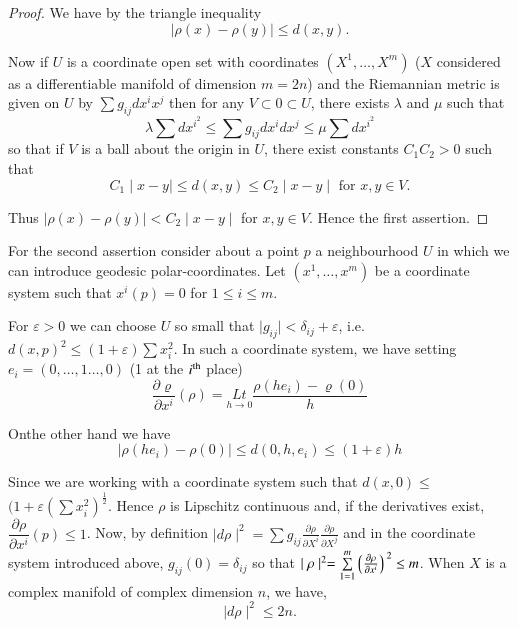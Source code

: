 \begin{proof}
  We have by the triangle inequality 
  $$ 
  \mid \rho  {(x)} - \rho  {(y)} \mid \leq  {d(x ,y)}.
  $$

  Now if $U$ is a coordinate open set with coordinates $(X^1,\ldots ,
  X^m)$ ($X$ considered as a  differentiable manifold of dimension $m=2
  n$) and the Riemannian metric is given on $U$ by $\sum g_{ij}dx^ix^j$
  then for any  $V \subset 0 \subset U$, there exists $\lambda$ and
  $\mu$ such that  
  $$
  \lambda \sum dx^{i^2} \leq \sum  g_{ij}dx^i dx^j \leq \mu \sum
  dx^{i^2}
  $$
  so that if $V$ is a ball about the origin in $U$, there exist constants
  $C_1 C_2 > 0$ such that  
  $$ 
  C_1 \mid x-y \mid \leq d(x, y) \leq C_2 \mid x-y \mid  \text{ for  }
  x, y \in  V. 
  $$

  Thus $ \mid \rho (x) - \rho (y) \mid < C_2 \mid x-y \mid$ for $x, y \in
  V$. Hence the first assertion. 
\end{proof}

For the second assertion consider about a point $p$ a neighbourhood $U$ in
which we can introduce geodesic polar-coordinates. Let $(x^1,
\ldots , x^m)$ be a coordinate system such that $x^i(p)=0$
for $1 \leq i \leq m$.  

For $\varepsilon > 0$ we can choose $U$ so small that $\mid g_{ij}
\mid <\delta_{ij} +\varepsilon$, i.e.  $d(x,p)^2 \leq (1 + \varepsilon ) \sum
x^2_i$. In such a coordinate system, we have setting $e_i = (0,\ldots ,1
\ldots ,0)$ (1 at the $i^{\rm th}$ place)  
$$
\frac{\partial \varrho}{\partial x^i}(\rho) =\underset{h\rightarrow 
  0}{Lt} \frac{\rho (he_i) - \varrho (0)}{h}
$$ 

On\pageoriginale the other hand we have 
$$
 {\mid \rho (he_i)-\rho (0) \mid \leq d( 0, h,e_i) \leq (1 + \varepsilon ) h}
$$

Since we are working with a coordinate system such that $d(x ,0
  )\leq$ $(1 + \varepsilon \left(\sum x^2_i\right)^{\frac{1}{2}}$. Hence $\rho$ is
Lipschitz continuous and, if the derivatives exist, $
{\dfrac{\partial \rho}{\partial x^i} (p) \leq 1}$. Now, by definition
$\mid d \rho \mid^2 =\sum g_{ij} \frac{\partial \rho}{ \partial
    X^i} \frac{\partial \rho }{\partial X^j}$ and in the coordinate
system introduced above, $g_{ij}(0) = \delta_{ij}$ so that $
\mid \rho \mid^2 = \overset{m}{\underset{1=1}\sum} \big\lgroup
  \frac{\partial \rho }{\partial x^i}\big\rgroup^2 \leq m$. When $X$ is
a complex manifold of complex dimension $n$, we have, 
$$
\mid d \rho \mid^2 \leq 2n.
$$


